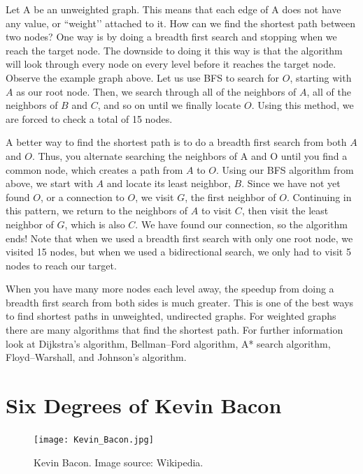 Let A be an unweighted graph. This means that each edge of A does not have any value, or ``weight’’ attached to it. How can we find the shortest path between two nodes? One way is by doing a breadth first search and stopping when we reach the target node. The downside to doing it this way is that the algorithm will look through every node on every level before it reaches the target node. Observe the example graph above. Let us use BFS to search for $O$, starting with $A$ as our root node. Then, we search through all of the neighbors of $A$,  all of the neighbors of $B$ and $C$, and so on until we finally locate $O$. Using this method, we are forced to check a total of 15 nodes.

A better way to find the shortest path is to do a breadth first search from both $A$ and $O$. Thus, you alternate searching the neighbors of A and O until you find a common node, which creates a path from $A$ to $O$.  Using our BFS algorithm from above, we start with $A$ and locate its least neighbor, $B$. Since we have not yet found $O$, or a connection to $O$, we visit $G$, the first neighbor of $O$. Continuing in this pattern, we return to the neighbors of $A$ to visit $C$, then visit the least neighbor of $G$, which is also $C$. We have found our connection, so the algorithm ends! Note that when we used a breadth first search with only one root node, we visited 15 nodes, but when we used a bidirectional search, we only had to visit 5 nodes to reach our target.

When you have many more nodes each level away, the speedup from doing a breadth first search from both sides is much greater. This is one of the best ways to find shortest paths in unweighted, undirected graphs. For weighted graphs there are many algorithms that find the shortest path. For further information look at Dijkstra's algorithm, Bellman–Ford algorithm, A* search algorithm, Floyd–Warshall, and Johnson's algorithm.

\section*{Six Degrees of Kevin Bacon}
\begin{figure}[h]
\texttt{[image: Kevin\_Bacon.jpg]}
\caption{Kevin Bacon.  Image source: Wikipedia.}
\end{figure}

